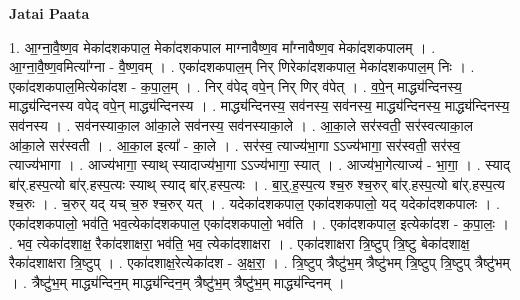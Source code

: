 \documentclass[17pt]{extarticle}
\begin{document}
\textbf{Jatai Paata} \newline

1. आ॒ग्ना॒वै॒ष्ण॒व मेका॑दशकपाल॒ मेका॑दशकपाल माग्नावैष्ण॒व मा᳚ग्नावैष्ण॒व मेका॑दशकपालम् । . आ॒ग्ना॒वै॒ष्ण॒वमित्या᳚ग्ना - वै॒ष्ण॒वम् । . एका॑दशकपाल॒म् निर् णिरेका॑दशकपाल॒ मेका॑दशकपाल॒म् निः । . एका॑दशकपाल॒मित्येका॑दश - क॒पा॒ल॒म् । . निर् व॑पेद् वपे॒न् निर् णिर् व॑पेत् । . व॒पे॒न् माद्ध्य॑न्दिनस्य॒ माद्ध्य॑न्दिनस्य वपेद् वपे॒न् माद्ध्य॑न्दिनस्य । . माद्ध्य॑न्दिनस्य॒ सव॑नस्य॒ सव॑नस्य॒ माद्ध्य॑न्दिनस्य॒ माद्ध्य॑न्दिनस्य॒ सव॑नस्य । . सव॑नस्याका॒ल आ॑का॒ले सव॑नस्य॒ सव॑नस्याका॒ले । . आ॒का॒ले सर॑स्वती॒ सर॑स्वत्याका॒ल आ॑का॒ले सर॑स्वती । . आ॒का॒ल इत्या᳚ - का॒ले । . सर॑स्व॒ त्याज्य॑भा॒गा ऽऽज्य॑भागा॒ सर॑स्वती॒ सर॑स्व॒ त्याज्य॑भागा । . आज्य॑भागा॒ स्याथ् स्यादाज्य॑भा॒गा ऽऽज्य॑भागा॒ स्यात् । . आज्य॑भा॒गेत्याज्य॑ - भा॒गा॒ । . स्याद् बा॑र्.हस्प॒त्यो बा॑र्.हस्प॒त्यः स्याथ् स्याद् बा॑र्.हस्प॒त्यः । . बा॒र्॒.ह॒स्प॒त्य श्च॒रु श्च॒रुर् बा॑र्.हस्प॒त्यो बा॑र्.हस्प॒त्य श्च॒रुः । . च॒रुर् यद् यच् च॒रु श्च॒रुर् यत् । . यदेका॑दशकपाल॒ एका॑दशकपालो॒ यद् यदेका॑दशकपालः । . एका॑दशकपालो॒ भव॑ति॒ भव॒त्येका॑दशकपाल॒ एका॑दशकपालो॒ भव॑ति । . एका॑दशकपाल॒ इत्येका॑दश - क॒पा॒लः॒ । . भव॒ त्येका॑दशाक्ष॒ रैका॑दशाक्षरा॒ भव॑ति॒ भव॒ त्येका॑दशाक्षरा । . एका॑दशाक्षरा त्रि॒ष्टुप् त्रि॒ष्टु बेका॑दशाक्ष॒ रैका॑दशाक्षरा त्रि॒ष्टुप् । . एका॑दशाक्ष॒रेत्येका॑दश - अ॒क्ष॒रा॒ । . त्रि॒ष्टुप् त्रैष्टु॑भ॒म् त्रैष्टु॑भम् त्रि॒ष्टुप् त्रि॒ष्टुप् त्रैष्टु॑भम् । . त्रैष्टु॑भ॒म् माद्ध्य॑न्दिन॒म् माद्ध्य॑न्दिन॒म् त्रैष्टु॑भ॒म् त्रैष्टु॑भ॒म् माद्ध्य॑न्दिनम् । \newline
\end{document}
